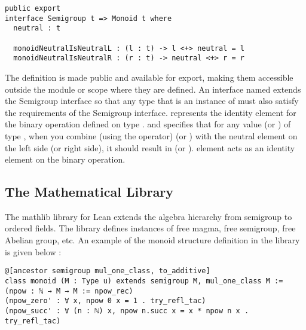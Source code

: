 \begin{verbatim}
public export
interface Semigroup t => Monoid t where
  neutral : t

  monoidNeutralIsNeutralL : (l : t) -> l <+> neutral = l
  monoidNeutralIsNeutralR : (r : t) -> neutral <+> r = r
\end{verbatim}

The definition is made public and available for export, making them
accessible outside the module or scope where they are defined. An interface
named  extends the Semigroup interface so that any
type  that is an instance of  must also
satisfy the requirements of the Semigroup interface. 
represents the identity element for the binary operation defined on type
.  and
 specifies that for any value
 (or ) of type , when you combine (using the
\inline{<+>} operator)  (or ) with the neutral element on
the left side (or right side), it should result in  (or ).
 element acts as an identity element on the binary operation.

\subsection{The Mathematical Library}

The mathlib library for Lean extends the algebra hierarchy from semigroup to
ordered fields. The library defines instances of free magma, free semigroup,
free Abelian group, etc. An example of the monoid structure definition in the
library is given below \cite{baanen2022use}: 

\begin{verbatim}
@[ancestor semigroup mul_one_class, to_additive]
class monoid (M : Type u) extends semigroup M, mul_one_class M :=
(npow : ℕ → M → M := npow_rec)
(npow_zero' : ∀ x, npow 0 x = 1 . try_refl_tac)
(npow_succ' : ∀ (n : ℕ) x, npow n.succ x = x * npow n x . try_refl_tac)
\end{verbatim}

